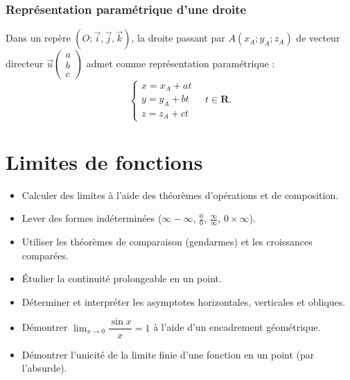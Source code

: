 \documentclass[11pt,a4paper,openany]{book}
\theoremstyle{definition}
\newcommand{\oijk}{(O;\vc{i},\vc{j},\vc{k})}
\newcommand{\vc}[1]{\overrightarrow{#1}}
\newcommand{\vcb}[3]{
    \left(\begin{array}{c}
        #1\\
        #2\\
        #3
    \end{array}\right)}
\newcommand{\nchap}{
    \setcounter{Définition}{0}
    \setcounter{Propriété}{0}
    \setcounter{Théorème}{0}
    \setcounter{Remarque}{0}
    \setcounter{Exemple}{0}
}
\begin{document}
    \subsection{Représentation paramétrique d'une droite}
    \begin{Propriété}
        Dans un repère $\oijk$, la droite passant par $A(x_A;y_A;z_A)$ de vecteur directeur
        $\vc{u}\vcb{a}{b}{c}$ admet comme représentation paramétrique :
        \[
            \left\{\begin{array}{l}
                x=x_A+at\\
                y=y_A+bt\\
                z=z_A+ct
            \end{array}\right.\quad t\in\mathbf{R}.
        \]
    \end{Propriété}

    \chapter{Limites de fonctions}
    \nchap

    \begin{capacitesbox}
    \begin{itemize}
        \item Calculer des limites à l'aide des théorèmes d'opérations et de composition.
        \item Lever des formes indéterminées ($\infty-\infty$, $\frac{0}{0}$, $\frac{\infty}{\infty}$, $0\times\infty$).
        \item Utiliser les théorèmes de comparaison (gendarmes) et les croissances comparées.
        \item Étudier la continuité prolongeable en un point.
        \item Déterminer et interpréter les asymptotes horizontales, verticales et obliques.
    \end{itemize}
    \end{capacitesbox}

    \begin{demoprogbox}
    \begin{itemize}
        \item Démontrer $\displaystyle\lim_{x\to 0}\dfrac{\sin x}{x}=1$ à l'aide d'un encadrement géométrique.
        \item Démontrer l'unicité de la limite finie d'une fonction en un point (par l'absurde).
    \end{itemize}
    \end{demoprogbox}
\end{document}
